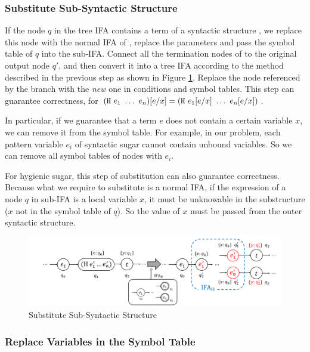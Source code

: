 \subsubsection{Substitute Sub-Syntactic Structure}

If the node $q$ in the tree IFA contains a term of a syntactic structure , we replace this node with the normal IFA of , replace the parameters and pass the symbol table of $q$ into the sub-IFA. Connect all the termination nodes of  to the original output node $q'$, and then convert it into a tree IFA according to the method described in the previous step as shown in Figure \ref{fig:nmlifa-subst}. Replace the node referenced by the branch with the \textit{new} one in conditions and symbol tables. This step can guarantee correctness, for $(\mbox{\tt H}~e_1~\ldots~e_n)[e/x] = (\mbox{\tt H}~e_1[e/x]~\ldots~e_n[e/x])$.

In particular, if we guarantee that a term $e$ does not contain a certain variable $x$, we can remove it from the symbol table. For example, in our problem, each pattern variable $e_i$ of syntactic sugar cannot contain unbound variables. So we can remove all symbol tables of nodes with $e_i$.

For hygienic sugar, this step of substitution can also guarantee correctness. Because what we require to substitute is a normal IFA, if the expression of a node $q$ in sub-IFA is a local variable $x$, it must be unknowable in the substructure ($x$ not in the symbol table of $q$). So the value of $x$ must be passed from the outer syntactic structure.

\begin{figure}[t]
    \centering
    \includegraphics[scale=0.25]{images/nmlifa/nmlifa-subst.png}
    \caption{Substitute Sub-Syntactic Structure}
    \label{fig:nmlifa-subst}
\end{figure}

\subsubsection{Replace Variables in the Symbol Table}

